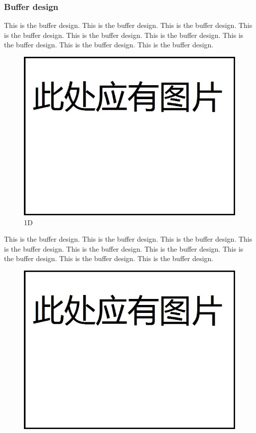 \documentclass[12pt]{article}
\begin{document}
\begin{flushleft}
\subsubsection{Buffer design}
This is the buffer design. This is the buffer design. This is the buffer design. This is the buffer design. This is the buffer design. This is the buffer design. This is the buffer design. This is the buffer design. This is the buffer design. 
\begin{figure}[h!]
	\begin{center}
		\includegraphics[scale = 0.6]{1D.jpg}
		\caption{1D}
	\end{center}
\end{figure}
This is the buffer design. This is the buffer design. This is the buffer design. This is the buffer design. This is the buffer design. This is the buffer design. This is the buffer design. This is the buffer design. This is the buffer design. 
\begin{figure}[h!]
	\begin{center}
		\includegraphics[scale = 0.6]{2D.jpg}

\end{center}
\end{figure}
\end{flushleft}
\end{document}
